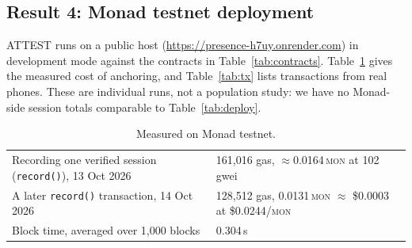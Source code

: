 \documentclass[10pt]{article}
\newcommand{\code}[1]{\texttt{\small #1}}
\newcommand{\mon}{\textsc{mon}}
\begin{document}
\subsection{Result 4: Monad testnet deployment}
ATTEST runs on a public host (\url{https://presence-h7uy.onrender.com}) in development mode against the contracts in
Table~\ref{tab:contracts}. Table~\ref{tab:cost} gives the measured cost of anchoring, and Table~\ref{tab:tx} lists
transactions from real phones. These are individual runs, not a population study: we have no Monad-side session totals
comparable to Table~\ref{tab:deploy}.

\begin{table}[h]\small\centering
\caption{Measured on Monad testnet.}\label{tab:cost}
\begin{tabular}{@{}ll@{}}\toprule
Recording one verified session (\code{record()}), 13 Oct 2026 & 161,016 gas, $\approx$0.0164\,\mon{} at 102\,gwei\\
A later \code{record()} transaction, 14 Oct 2026 & 128,512 gas, 0.0131\,\mon{} $\approx$ \$0.0003 at \$0.0244/\mon{}\\
Block time, averaged over 1,000 blocks & 0.304\,s\\\bottomrule
\end{tabular}
\end{table}
\end{document}

